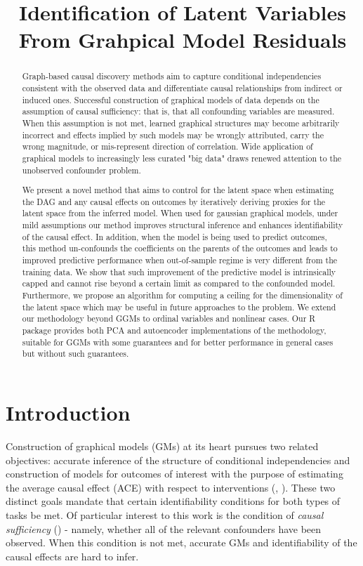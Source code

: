 \documentclass[letterpaper]{article}
\title{Identification of Latent Variables From Grahpical Model Residuals}
\begin{document}
\maketitle

\begin{abstract}
Graph-based causal discovery methods aim to capture conditional independencies consistent with the observed data and differentiate causal relationships from indirect or induced ones.  Successful construction of graphical models of data depends on the assumption of causal sufficiency: that is, that all confounding variables are measured. When this assumption is not met, learned graphical structures may become arbitrarily incorrect and effects implied by such models may be wrongly attributed, carry the wrong magnitude, or mis-represent direction of correlation.  Wide application of graphical models to increasingly less curated "big data" draws renewed attention to the unobserved confounder problem.  

We present a novel method that aims to control for the latent space when estimating the DAG and any causal effects on outcomes by iteratively deriving proxies for the latent space from the inferred model.  When used for gaussian graphical models, under mild assumptions our method improves structural inference and enhances identifiability of the causal effect. In addition, when the model is being used to predict outcomes, this method un-confounds the coefficients on the parents of the outcomes and leads to improved predictive performance when out-of-sample regime is very different from the training data.  We show that such improvement of the predictive model is intrinsically capped and cannot rise beyond a certain limit as compared to the confounded model.  Furthermore, we propose an algorithm for computing a ceiling for the dimensionality of the latent space which may be useful in future approaches to the problem.  We extend our methodology beyond GGMs to ordinal variables and nonlinear cases.  Our R package provides both PCA and autoencoder implementations of the methodology, suitable for GGMs with some guarantees and for better performance in general cases but without such guarantees. 
\end{abstract}

\section{Introduction}
\label{introduction}

Construction of graphical models (GMs) at its heart pursues two related objectives: accurate inference of the structure of conditional independencies and construction of models for outcomes of interest with the purpose of estimating the average causal effect (ACE) with respect to interventions (\cite{pearl_causality:_2000}, \cite{hernan_estimating_2006}).  These two distinct goals mandate that certain identifiability conditions for both types of tasks be met.  Of particular interest to this work is the condition of \textit{causal sufficiency} (\cite{spirtes_causation_1993}) - namely, whether all of the relevant confounders have been observed.  When this condition is not met, accurate GMs and identifiability of the causal effects are hard to infer.
\end{document}
